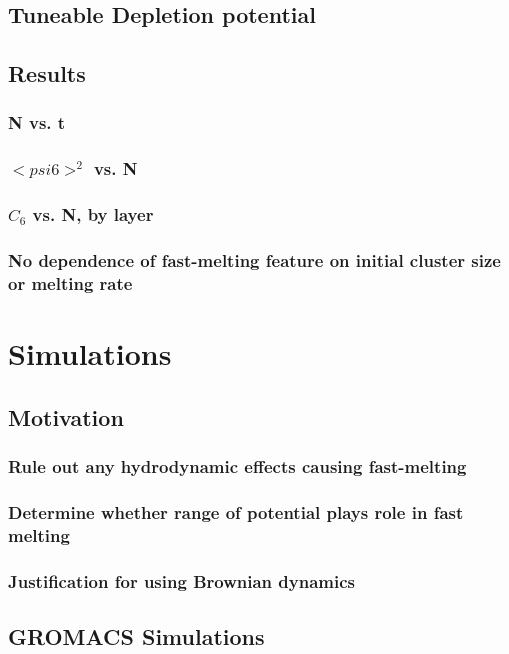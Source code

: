 \documentclass{umthesis}
\begin{document}
\subsection{Tuneable Depletion potential}
\label{sec-1.2.2}
\subsection{Results}
\label{sec-1.2.3}
\subsubsection{N vs. t}
\label{sec-1.2.3.1}
\subsubsection{$< psi6 >^2$ vs. N}
\label{sec-1.2.3.2}
\subsubsection{$C_6$ vs. N, by layer}
\label{sec-1.2.3.3}
\subsubsection{No dependence of fast-melting feature on initial cluster size or melting rate}
\label{sec-1.2.3.4}
\section{Simulations}
\label{sec-1.3}
\subsection{Motivation}
\label{sec-1.3.1}
\subsubsection{Rule out any hydrodynamic effects causing fast-melting}
\label{sec-1.3.1.1}
\subsubsection{Determine whether range of potential plays role in fast melting}
\label{sec-1.3.1.2}
\subsubsection{Justification for using Brownian dynamics}
\label{sec-1.3.1.3}
\subsection{GROMACS Simulations}
\label{sec-1.3.2}
\end{document}
